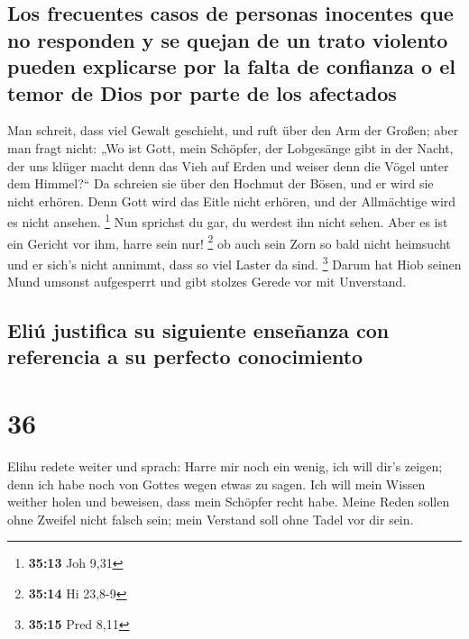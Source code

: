 \hypertarget{los-frecuentes-casos-de-personas-inocentes-que-no-responden-y-se-quejan-de-un-trato-violento-pueden-explicarse-por-la-falta-de-confianza-o-el-temor-de-dios-por-parte-de-los-afectados}{%
\subsection{Los frecuentes casos de personas inocentes que no responden
y se quejan de un trato violento pueden explicarse por la falta de
confianza o el temor de Dios por parte de los
afectados}\label{los-frecuentes-casos-de-personas-inocentes-que-no-responden-y-se-quejan-de-un-trato-violento-pueden-explicarse-por-la-falta-de-confianza-o-el-temor-de-dios-por-parte-de-los-afectados}}

 Man schreit, dass viel Gewalt geschieht, und ruft über
den Arm der Großen;  aber man fragt nicht: „Wo ist Gott,
mein Schöpfer, der Lobgesänge gibt in der Nacht,  der uns
klüger macht denn das Vieh auf Erden und weiser denn die Vögel unter dem
Himmel?{}``  Da schreien sie über den Hochmut der Bösen,
und er wird sie nicht erhören.  Denn Gott wird das Eitle
nicht erhören, und der Allmächtige wird es nicht ansehen. \footnote{\textbf{35:13}
  Joh 9,31}  Nun sprichst du gar, du werdest ihn nicht
sehen. Aber es ist ein Gericht vor ihm, harre sein nur! \footnote{\textbf{35:14}
  Hi 23,8-9}  ob auch sein Zorn so bald nicht heimsucht
und er sich's nicht annimmt, dass so viel Laster da sind. \footnote{\textbf{35:15}
  Pred 8,11}  Darum hat Hiob seinen Mund umsonst
aufgesperrt und gibt stolzes Gerede vor mit Unverstand.

\hypertarget{eliuxfa-justifica-su-siguiente-enseuxf1anza-con-referencia-a-su-perfecto-conocimiento}{%
\subsection{Eliú justifica su siguiente enseñanza con referencia a su
perfecto
conocimiento}\label{eliuxfa-justifica-su-siguiente-enseuxf1anza-con-referencia-a-su-perfecto-conocimiento}}

\hypertarget{section-35}{%
\section{36}\label{section-35}}

 Elihu redete weiter und sprach:  Harre mir
noch ein wenig, ich will dir's zeigen; denn ich habe noch von Gottes
wegen etwas zu sagen.  Ich will mein Wissen weither holen
und beweisen, dass mein Schöpfer recht habe.  Meine Reden
sollen ohne Zweifel nicht falsch sein; mein Verstand soll ohne Tadel vor
dir sein.

